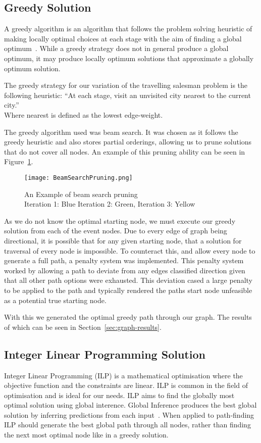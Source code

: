 \documentclass[bsc,frontabs,twoside,singlespacing,parskip,deptreport]{infthesis}     %
\begin{document}
\subsection{Greedy Solution}
A greedy algorithm is an algorithm that follows the problem solving heuristic of making locally optimal choices at each stage with the aim
of finding a global optimum~\cite{black2004dictionary}.
While a greedy strategy does not in general produce a global optimum, it may produce locally optimum solutions that approximate a globally optimum solution.


The greedy strategy for our variation of the travelling salesman problem is the following heuristic:
``At each stage, visit an unvisited city nearest to the current city.''\\
Where nearest is defined as the lowest edge-weight.


The greedy algorithm used was beam search.
It was chosen as it follows the greedy heuristic and also stores partial orderings,
allowing us to prune solutions that do not cover all nodes.
An example of this pruning ability can be seen in Figure~\ref{fig:beam-prune}.

\begin{figure}
  \centering
  \texttt{[image: BeamSearchPruning.png]}
  \caption{An Example of beam search pruning\\ Iteration 1: Blue Iteration 2: Green, Iteration 3: Yellow}
  \label{fig:beam-prune}
\end{figure}

As we do not know the optimal starting node, we must execute our greedy solution from each of the event nodes.
Due to every edge of graph being directional, it is possible that for any given starting node, that a solution for traversal
of every node is impossible. To counteract this, and allow every node to generate a full path, a penalty system was implemented.
This penalty system worked by allowing a path to deviate from any edges classified direction given that all other path options
were exhausted. This deviation cased a large penalty to be applied to the path and typically rendered the paths start node
unfeasible as a potential true starting node. 

With this we generated the optimal greedy path through our graph. The results of which can be seen in Section~\ref{sec:graph-results}.

\subsection{Integer Linear Programming Solution}
Integer Linear Programming (ILP) is a mathematical optimisation where the objective function and the constraints are linear.
ILP is common in the field of optimisation and is ideal for our needs. ILP aims to find the globally most optimal solution using global interence.
Global Inference produces the best global solution by inferring predictions from each input~\cite{roth2004linear}.%
When applied to path-finding ILP should generate the best global path through all nodes, rather than finding the next most optimal node like in a greedy solution.
\end{document}

